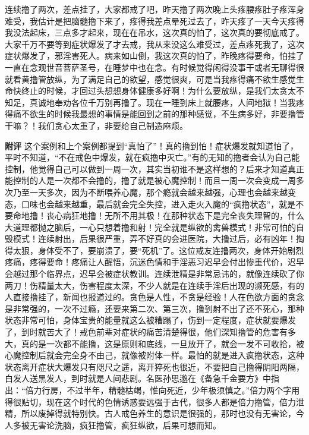 \begin{case}
    连续撸了两次，差点挂了，大家都戒了吧，昨天撸了两次晚上头疼腰疼肚子疼浑身难受，我估计是把脑髓撸下来了，疼得我差点晕死过去了，昨天疼了一天今天疼得我没法起床，三点多才起来，现在在吊水，这次真的怕了，这次真的要彻底戒了。大家千万不要等到症状爆发了才去戒，我从来没这么难受过，差点疼死我了，这次症状爆发了，邪淫害死人。病来如山倒，我这次真的怕了，昨晚疼得要命，怕挂了一直在念观世音菩萨圣号，在睡梦中也在念。有时候觉得闲得没事干或者无聊得很就看黄撸管放纵，为了满足自己的欲望，感觉很爽，可是当我疼得痛不欲生感觉生命快终止的时候，才回过头想想身体健康多好啊！为什么要放纵，是我们太贪太不知足，真诚地奉劝各位千万别再撸了。现在一睡到床上就腰疼，人间地狱！当我疼得痛不欲生的时候我最想的事情是能回到之前的那种感觉，不生病多好，非要撸管干嘛？！我们贪心太重了，非要给自己制造麻烦。

    \textbf{附评} 这个案例和上个案例都提到“真怕了”！真的撸到怕！症状爆发就知道怕了，平时不知道，“不在戒色中爆发，就在疯撸中灭亡。”有的无知的撸者会认为自己能控制，他觉得自己可以做到一周一次，其实当初谁不是这样想的？后来才知道真正能控制的人是一次都不会撸的，撸了就是被心魔控制！而且一周一次会变成一周多次乃至一天多次，因为不断喂养心魔，那个瘾就会越来越强，心理也会越来越变态，口味也会越来越重，最后就会完全失控，进入走火入魔的“疯撸状态”，就是不要命地撸！丧心病狂地撸！无所不用其极！在那种状态下是完全丧失理智的，什么大道理都抛之脑后，一心只想着撸和射！完全就是纵欲的禽兽模式！非常可怕的自毁模式！连续射出，后果很严重，弄不好真的会进医院，大撸过后，必有凶年！掏得太狠，身体受不了，要崩溃了，要“死机”了。这位戒友连撸两次，身体开始剧烈疼痛，疼得要命！疼痛让人醒悟，沉迷色情和手淫恶习迟早会付出惨重代价，迟早会越过那个临界点，迟早会被症状教训。连续泄精是非常忌讳的，就像连续砍了你两刀！伤精量太大，伤害程度太深，不少人就是在连续手淫后出现的濒死感，有的人直接撸挂了，新闻也报道过的。贪色是人性，不贪是经验！人在色欲方面的贪念是非常强的，一次不过瘾，还要来第二次、第三次，撸到射不出了还不死心，那种状态非常可怕，身体宝贵的能量就这么被糟蹋了，伤到一定程度，症状就要爆发了，到时就苦大了！戒色前辈对症状的痛苦清楚得很，他们深知撸管的危害有多大，真的是一次都不能撸，这是原则和底线，一旦放开了，就会一发不可收拾，被心魔控制后就会完全身不由己，就像被附体一样。最怕的就是进入疯撸状态，这种状态离开症状大爆发只有咫尺之遥，离开猝死也很近，不要把自己撸得阴阳两隔，白发人送黑发人，到时就是人间悲剧。名医孙思邈在《备急千金要方》中指出：“倍力行房，不过半年，精髓枯竭，惟向死近，少年极须慎之。”倍力两个字用得很贴切，现在这个时代的色情诱惑要远强于古代，很多人都是倍力撸管，倍力泄精，所以废掉得就特别快。古人戒色养生的意识是很强的，那时也没有无害论，今人多被无害论洗脑，疯狂撸管，疯狂纵欲，后果可想而知。
\end{case}


